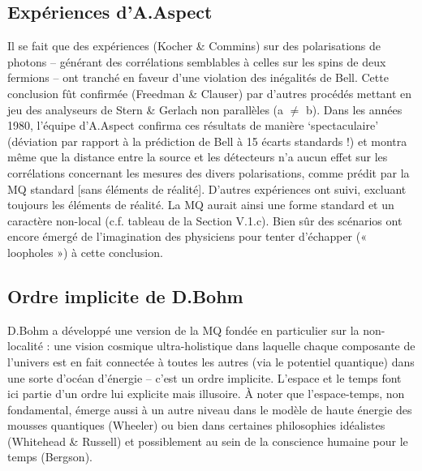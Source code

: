 \subsection{Expériences d’A.Aspect}
Il se fait que des expériences (Kocher \& Commins) sur des polarisations de photons –
générant des corrélations semblables à celles sur les spins de deux fermions – ont tranché en
faveur d’une violation des inégalités de Bell. Cette conclusion fût confirmée (Freedman \&
Clauser) par d’autres procédés mettant en jeu des analyseurs de Stern \& Gerlach non
parallèles (a $\neq$ b). Dans les années 1980, l’équipe d’A.Aspect confirma ces résultats de
manière ‘spectaculaire’ (déviation par rapport à la prédiction de Bell à 15 écarts standards !)
et montra même que la distance entre la source et les détecteurs n’a aucun effet sur les
corrélations concernant les mesures des divers polarisations, comme prédit par la MQ
standard [sans éléments de réalité]. D’autres expériences ont suivi, excluant toujours les
éléments de réalité. La MQ aurait ainsi une forme standard et un caractère non-local (c.f.
tableau de la Section V.1.c). Bien sûr des scénarios ont encore émergé de l’imagination des
physiciens pour tenter d’échapper (« loopholes ») à cette conclusion.
\subsection{Ordre implicite de D.Bohm}
D.Bohm a développé une version de la MQ fondée en particulier sur la non-localité : une
vision cosmique ultra-holistique dans laquelle chaque composante de l’univers est en fait
connectée à toutes les autres (via le potentiel quantique) dans une sorte d’océan d’énergie –
c’est un ordre implicite. L’espace et le temps font ici partie d’un ordre lui explicite mais
illusoire. À noter que l’espace-temps, non fondamental, émerge aussi à un autre niveau dans
le modèle de haute énergie des mousses quantiques (Wheeler) ou bien dans certaines
philosophies idéalistes (Whitehead \& Russell) et possiblement au sein de la conscience
humaine pour le temps (Bergson).
